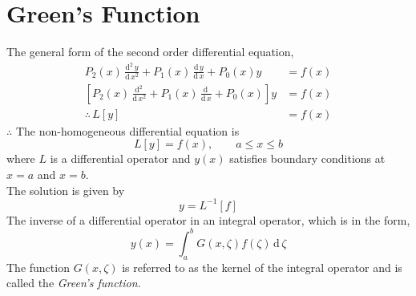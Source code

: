 \documentclass[12pt,a4paper]{article}
\theoremstyle{remark}
\theoremstyle{definition}
\newcommand{\ddx}[1]{\,\frac{\mathrm{d}\,#1}{\mathrm{d}\,x}}
\newcommand{\D}{\,\mathrm{d}\,}
\newcommand{\ddxn}[2]{\,\frac{\mathrm{d}^{#2}\, #1}{\mathrm{d}\, x^{#2}}}
\begin{document}
\section{Green's Function}
The general form of the second order differential equation,
\begin{align*}
    P_2(x)\ddxn{y}{2}+P_1(x)\ddx{y}+P_0(x)y              & =f(x) \\
    \left[ P_2(x)\ddxn{}{2}+P_1(x)\ddx{}+P_0(x) \right]y & =f(x) \\
    \therefore \,L[y]                                    & =f(x)
\end{align*}
$ \therefore $ The non-homogeneous differential equation is
\[
    L[y]=f(x),\qquad a\leq x\leq b
\]
where $ L $ is a differential operator and $ y(x) $ satisfies boundary conditions at $ x=a $ and $ x=b $.\\
The solution is given by
\[
    y=L^{-1}[f]
\]
The inverse of a differential operator in an integral operator, which is in the form,
\[
    y(x)=\int_a^b G(x,\zeta)f(\zeta)\D \zeta
\]
The function $ G(x,\zeta) $ is referred to as the kernel of the integral operator and is called the \emph{Green's function.}\\
\end{document}
